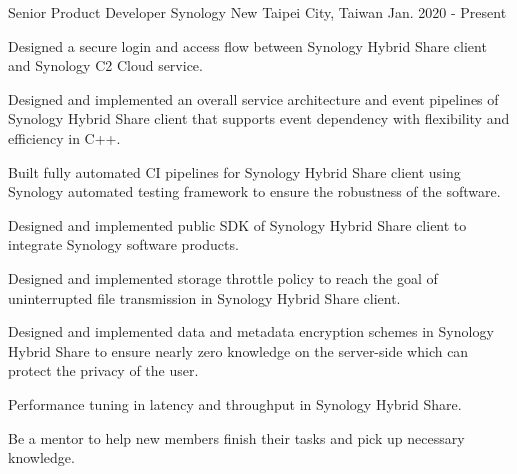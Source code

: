 

\begin{cventries}

  \cventry
    {Senior Product Developer} %
    {Synology} %
    {New Taipei City, Taiwan} %
    {Jan. 2020 - Present} %
    {
      \begin{cvitems} %
        \item {Designed a secure login and access flow between Synology Hybrid Share client and Synology C2 Cloud service.}
        \item {Designed and implemented an overall service architecture and event pipelines of Synology Hybrid Share client that supports event dependency with flexibility and efficiency in C++.}
        \item {Built fully automated CI pipelines for Synology Hybrid Share client using Synology automated testing framework to ensure the robustness of the software.}
        \item {Designed and implemented public SDK of Synology Hybrid Share client to integrate Synology software products.}
        \item {Designed and implemented storage throttle policy to reach the goal of uninterrupted file transmission in Synology Hybrid Share client.}
        \item {Designed and implemented data and metadata encryption schemes in Synology Hybrid Share to ensure nearly zero knowledge on the server-side which can protect the privacy of the user.}
        \item {Performance tuning in latency and throughput in Synology Hybrid Share.}
        \item {Be a mentor to help new members finish their tasks and pick up necessary knowledge.}
      \end{cvitems}
    }


\end{cventries}
